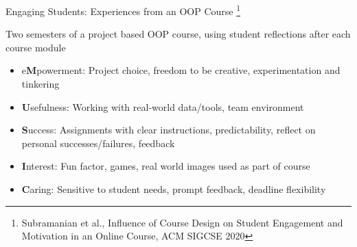 \documentclass[aspectratio=169]{beamer}
\begin{document}
\begin{frame}{Engaging Students: Experiences from an OOP Course
\footnote{Subramanian et al., Influence of Course Design on Student Engagement and Motivation in an Online Course, ACM SIGCSE 2020}}
\begin{block}{Two semesters of a project based OOP course, using
student  reflections after each course module}
\end{block}
\begin{itemize} 
	\item e\textbf{M}powerment: Project choice, freedom to be creative, 
		experimentation and tinkering
	\item \textbf{U}sefulness: Working with real-world data/tools, team
		environment
	\item \textbf{S}uccess: Assignments with clear instructions, predictability,
			reflect on personal successes/failures, feedback
	\item \textbf{I}nterest: Fun factor,  games, real world images used
		as part of course
	\item \textbf{C}aring: Sensitive to student needs, prompt feedback, deadline
		flexibility
\end{itemize}
\end{frame}
\end{document}
